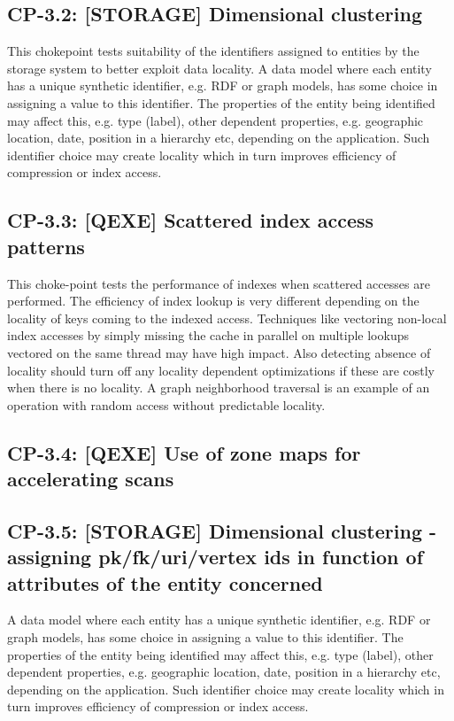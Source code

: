 

\subsection*{CP-3.2: [STORAGE] Dimensional clustering}
\label{choke_point_3.2}

This chokepoint tests suitability of the identifiers assigned to entities by the storage system to better exploit data locality. A data model where each entity has a unique synthetic identifier,
e.g. RDF or graph models, has some choice in assigning a value to this identifier. The properties of the entity being identified may affect this, e.g. type (label), other dependent properties,
e.g. geographic location, date, position in a hierarchy etc, depending on the application. Such identifier choice may create locality which in turn improves efficiency of compression or index access.



\subsection*{CP-3.3: [QEXE] Scattered index access patterns}
\label{choke_point_3.3}

This choke-point tests the performance of indexes when scattered accesses are performed. The efficiency of index lookup is very different depending on the locality of keys coming to the indexed access.
Techniques like vectoring non-local index accesses by simply missing the cache in parallel on multiple lookups vectored on the same thread may have high impact.
Also detecting absence of locality should turn off any locality dependent optimizations if these are costly when there is no locality. A graph neighborhood traversal is an example of an operation with random access without predictable locality.

%

\subsection*{CP-3.4: [QEXE] Use of zone maps for accelerating scans}
\label{choke_point_3.4}
%

\subsection*{CP-3.5: [STORAGE] Dimensional clustering - assigning pk/fk/uri/vertex ids in function of attributes of the entity concerned}
\label{choke_point_3.5}
A data model where each entity has a unique synthetic identifier, e.g. RDF or graph models, has some choice in assigning a value to this identifier. The properties of the entity being identified may affect this, e.g. type (label), other dependent properties, e.g. geographic location, date, position in a hierarchy etc, depending on the application. Such identifier choice may create locality which in turn improves efficiency of compression or index access.

